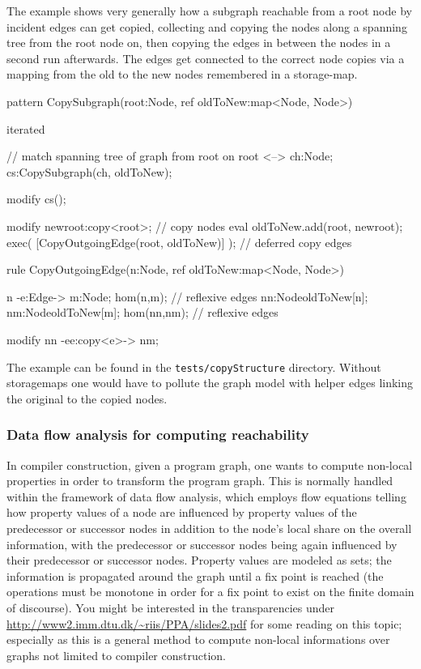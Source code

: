   \begin{example}
The example shows very generally how a subgraph reachable from a root node by incident edges can get copied, collecting and copying the nodes along a spanning tree from the root node on, then copying the edges in between the nodes in a second run afterwards. The edges get connected to the correct node copies via a mapping from the old to the new nodes remembered in a storage-map.
    \begin{grgen}
pattern CopySubgraph(root:Node, ref oldToNew:map<Node, Node>)
{
  iterated { // match spanning tree of graph from root on
    root <--> ch:Node;   	
    cs:CopySubgraph(ch, oldToNew);
    
    modify {
      cs();
    }
  }
  
  modify {
    newroot:copy<root>; // copy nodes
    eval { oldToNew.add(root, newroot); }
    exec( [CopyOutgoingEdge(root, oldToNew)] ); // deferred copy edges
  }
}

rule CopyOutgoingEdge(n:Node, ref oldToNew:map<Node, Node>)
{
  n -e:Edge-> m:Node;
  hom(n,m); // reflexive edges
  nn:Node{oldToNew[n]}; nm:Node{oldToNew[m]};
  hom(nn,nm); // reflexive edges
    
  modify {
    nn -ee:copy<e>-> nm;
  }
}
    \end{grgen}
  \end{example}

The example can be found in the \texttt{tests/copyStructure} directory.
Without storagemaps one would have to pollute the graph model with helper edges linking the original to the copied nodes.

\subsubsection*{Data flow analysis for computing reachability}\label{subsub:flow}

In compiler construction, given a program graph, one wants to compute non-local properties in order to transform the program graph.
This is normally handled within the framework of data flow analysis, which employs flow equations telling how property values of a node are influenced by property values of the predecessor or successor nodes in addition to the node's local share on the overall information, with the predecessor or successor nodes being again influenced by their predecessor or successor nodes.
Property values are modeled as sets; the information is propagated around the graph until a fix point is reached (the operations must be monotone in order for a fix point to exist on the finite domain of discourse).
You might be interested in the transparencies under \url{http://www2.imm.dtu.dk/~riis/PPA/slides2.pdf} for some reading on this topic;
especially as this is a general method to compute non-local informations over graphs not limited to compiler construction.

